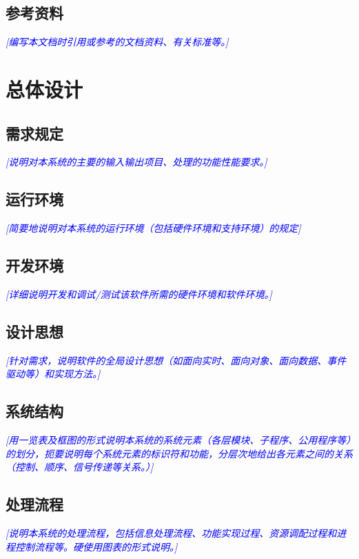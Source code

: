 \documentclass[12pt,a4pape，titlepager]{article}
\newcommand{\bluefont}[1]{\textcolor{blue}{\emph{[#1]}}}
\begin{document}
	\subsection{参考资料}{
		\bluefont{编写本文档时引用或参考的文档资料、有关标准等。}
	}
	\section{总体设计}
	\subsection{需求规定}{
		\bluefont{说明对本系统的主要的输入输出项目、处理的功能性能要求。}
	}
	\subsection{运行环境}{
		\bluefont{简要地说明对本系统的运行环境（包括硬件环境和支持环境）的规定}
	}
	\subsection{开发环境}{
		\bluefont{详细说明开发和调试/测试该软件所需的硬件环境和软件环境。}
	}
	\subsection{设计思想}{
		\bluefont{针对需求，说明软件的全局设计思想（如面向实时、面向对象、面向数据、事件驱动等）和实现方法。}
	}
	\subsection{系统结构}{
		\bluefont{用一览表及框图的形式说明本系统的系统元素（各层模块、子程序、公用程序等）的划分，扼要说明每个系统元素的标识符和功能，分层次地给出各元素之间的关系（控制、顺序、信号传递等关系。）}
	}
	\subsection{处理流程}{
		\bluefont{说明本系统的处理流程，包括信息处理流程、功能实现过程、资源调配过程和进程控制流程等。硬使用图表的形式说明。}
	}
\end{document}
